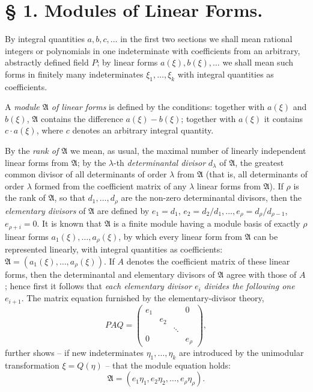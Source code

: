 \documentclass[11pt]{article}
\providecommand{\Amod}{\mathfrak A}
\providecommand{\Amod}{\mathfrak A}
\begin{document}
\section*{§ 1. Modules of Linear Forms.}

By integral quantities $a,b,c,\ldots$ in the first two sections we shall mean rational integers or polynomials in one indeterminate with coefficients from an arbitrary, abstractly defined field $P$; by linear forms $a(\xi),b(\xi),\ldots$ we shall mean such forms in finitely many indeterminates $\xi_1,\ldots,\xi_k$ with integral quantities as coefficients.

A \emph{module $\Amod$ of linear forms} is defined by the conditions: together with $a(\xi)$ and $b(\xi)$, $\Amod$ contains the difference $a(\xi)-b(\xi)$; together with $a(\xi)$ it contains $c\cdot a(\xi)$, where $c$ denotes an arbitrary integral quantity.

By the \emph{rank of $\Amod$} we mean, as usual, the maximal number of linearly independent linear forms from $\Amod$; by the $\lambda$-th \emph{determinantal divisor} $d_\lambda$ of $\Amod$, the greatest common divisor of all determinants of order $\lambda$ from $\Amod$ (that is, all determinants of order $\lambda$ formed from the coefficient matrix of any $\lambda$ linear forms from $\Amod$). If $\rho$ is the rank of $\Amod$, so that $d_1,\ldots,d_\rho$ are the non-zero determinantal divisors, then the \emph{elementary divisors} of $\Amod$ are defined by $e_1=d_1$, $e_2=d_2/d_1,\ldots,e_\rho=d_\rho/d_{\rho-1}$, $e_{\rho+i}=0$. It is known that $\Amod$ is a finite module having a module basis of exactly $\rho$ linear forms $a_1(\xi),\ldots,a_\rho(\xi)$, by which every linear form from $\Amod$ can be represented linearly, with integral quantities as coefficients: $\Amod=(a_1(\xi),\ldots,a_\rho(\xi))$. If $A$ denotes the coefficient matrix of these linear forms, then the determinantal and elementary divisors of $\Amod$ agree with those of $A$; hence first it follows that \emph{each elementary divisor $e_i$ divides the following one $e_{i+1}$}. The matrix equation furnished by the elementary-divisor theory,
\[
 P A Q=\begin{pmatrix}
 e_1&&&0\\
 &e_2&&\\
 &&\ddots&\\
 0&&&e_\rho
 \end{pmatrix},
\]
further shows -- if new indeterminates $\eta_1,\ldots,\eta_k$ are introduced by the unimodular transformation $\xi=Q(\eta)$ -- that the module equation holds:
\begin{equation}
 \Amod=(e_1\eta_1,e_2\eta_2,\ldots,e_\rho\eta_\rho).
\tag{1}
\end{equation}
\end{document}
